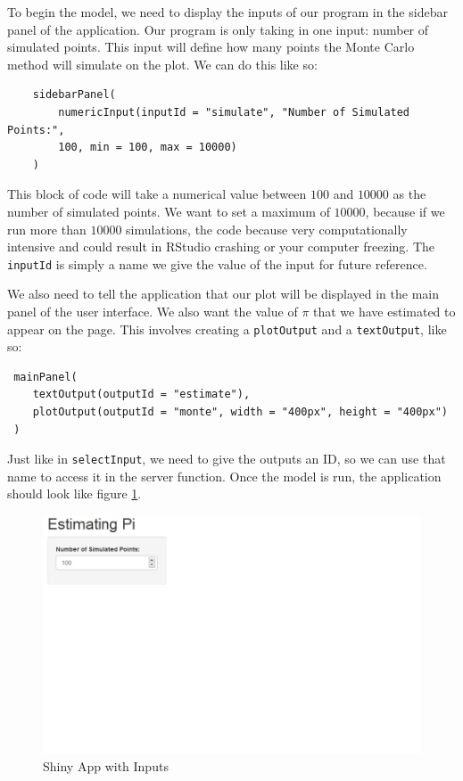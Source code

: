 \noindent 
To begin the model, we need to display the inputs of our program in the sidebar panel of the application.
Our program is only taking in one input: number of simulated points.
This input will define how many points the Monte Carlo method will simulate on the plot.
We can do this like so:

\begin{lstlisting}
    sidebarPanel(
        numericInput(inputId = "simulate", "Number of Simulated Points:",
        100, min = 100, max = 10000)
    )
\end{lstlisting}
 
 \noindent 
 This block of code will take a numerical value between $100$ and $10000$ as the number of simulated points.
 We want to set a maximum of $10000$, because if we run more than $10000$ simulations, the code because very computationally intensive and could result in RStudio crashing or your computer freezing.
 The \texttt{inputId} is simply a name we give the value of the input for future reference. 
 
 \noindent 
 We also need to tell the application that our plot will be displayed in the main panel of the user interface.
 We also want the value of $\pi$ that we have estimated to appear on the page.
 This involves creating a \texttt{plotOutput} and a \texttt{textOutput}, like so:

\begin{lstlisting}
 mainPanel(
    textOutput(outputId = "estimate"),
    plotOutput(outputId = "monte", width = "400px", height = "400px")
 )
\end{lstlisting}

\noindent 
Just like in \texttt{selectInput}, we need to give the outputs an ID, so we can use that name to access it in the server function.
Once the model is run, the application should look like figure \ref{fig:appwithinputs}. 

\begin{figure}[htbp!]
   \centering
   \includegraphics[width=.5\textwidth]{pictures/pi/input.PNG} 
   \caption{Shiny App with Inputs}
   \label{fig:appwithinputs}
\end{figure}
 
